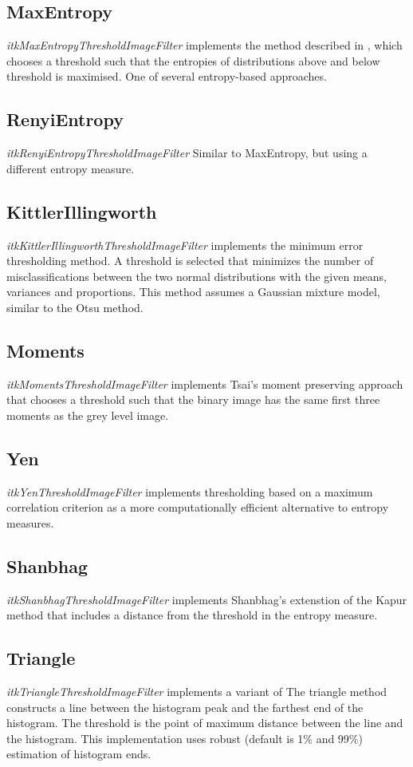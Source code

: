 \documentclass{InsightArticle}
\begin{document}
\subsection{MaxEntropy}
 {\em itkMaxEntropyThresholdImageFilter} implements the method
 described in \cite{kapur1985new}, which chooses a threshold such that the entropies of distributions above and
below threshold is maximised. One of several entropy-based approaches.
\subsection{RenyiEntropy}
{\em itkRenyiEntropyThresholdImageFilter} Similar to MaxEntropy, but using a different entropy measure\cite{kapur1985new}.

\subsection{KittlerIllingworth}
 {\em itkKittlerIllingworthThresholdImageFilter} implements the minimum
error thresholding method\cite{kittler1986minimum}. A threshold is
selected that minimizes the number of misclassifications between the
two normal distributions with the given means, variances and
proportions. This method assumes a Gaussian mixture model, similar to
the Otsu method.
\subsection{Moments}
{\em itkMomentsThresholdImageFilter} implements Tsai's moment
preserving approach \cite{tsai1985moment} that chooses a threshold such that the binary image has the same first three moments as the grey level image.
\subsection{Yen}
{\em itkYenThresholdImageFilter} implements thresholding based on a
maximum correlation criterion \cite{yen1995new} as a more
computationally efficient alternative to entropy measures.

\subsection{Shanbhag}
 {\em itkShanbhagThresholdImageFilter} implements Shanbhag's
 extenstion of the Kapur method\cite{shanbhag1994utilization} that
 includes a distance from the threshold in the entropy measure.

\subsection{Triangle}
{\em itkTriangleThresholdImageFilter} implements a variant of \cite{zack1977automatic}
The triangle method constructs a line between the histogram peak and
the farthest end of the histogram. The threshold is the point of
maximum distance between the line and the histogram. This
implementation uses robust (default is 1\% and 99\%) estimation of histogram ends.
\end{document}
